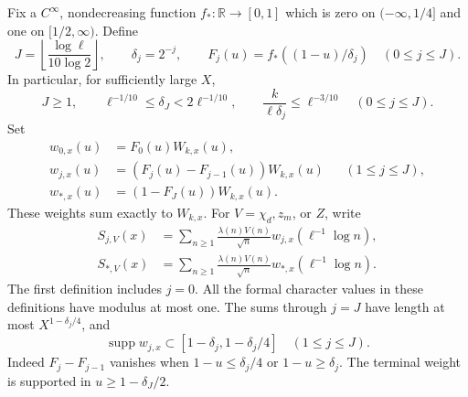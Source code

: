 Fix a \(C^\infty\), nondecreasing function \(f_*\colon\mathbb R\to[0,1]\)
which is zero on \((-\infty,1/4]\) and one on \([1/2,\infty)\).
Define
\begin{equation}
 J=\left\lfloor\frac{\log\ell}{10\log2}\right\rfloor,\qquad
 \delta_j=2^{-j},\qquad
 F_j(u)=f_*((1-u)/\delta_j)\quad(0\le j\le J).
 \label{weights:scales}
\end{equation}
In particular, for sufficiently large \(X\),
\begin{equation}
 J\ge1,\qquad
 \ell^{-1/10}\le\delta_J<2\ell^{-1/10},\qquad
 \frac{k}{\ell\delta_j}\le\ell^{-3/10}
       \quad(0\le j\le J).
 \label{weights:scale-bounds}
\end{equation}
Set
\begin{equation}
 \begin{aligned}
 w_{0,x}(u)&=F_0(u)W_{k,x}(u),\\
 w_{j,x}(u)&=(F_j(u)-F_{j-1}(u))W_{k,x}(u)
                    &&(1\le j\le J),\\
 w_{*,x}(u)&=(1-F_J(u))W_{k,x}(u).
 \end{aligned}
 \label{weights:partition}
\end{equation}
These weights sum exactly to \(W_{k,x}\). For \(V=\chi_d,z_m\), or \(Z\),
write
\begin{equation}
 \begin{aligned}
 S_{j,V}(x)&=\sum_{n\ge1}
       \frac{\lambda(n)V(n)}{\sqrt n}w_{j,x}(\ell^{-1}\log n),\\
 S_{*,V}(x)&=\sum_{n\ge1}
       \frac{\lambda(n)V(n)}{\sqrt n}w_{*,x}(\ell^{-1}\log n).
 \end{aligned}
 \label{weights:S}
\end{equation}
The first definition includes \(j=0\). All the formal character
values in these definitions have modulus at most one. The sums
through \(j=J\) have length at most \(X^{1-\delta_j/4}\), and
\begin{equation}
 \operatorname{supp} w_{j,x}
       \subset[1-\delta_j,1-\delta_j/4]\quad(1\le j\le J).
 \label{weights:short-support}
\end{equation}
Indeed \(F_j-F_{j-1}\) vanishes when \(1-u\le\delta_j/4\) or
\(1-u\ge\delta_j\). The terminal weight is supported in
\(u\ge1-\delta_J/2\).

